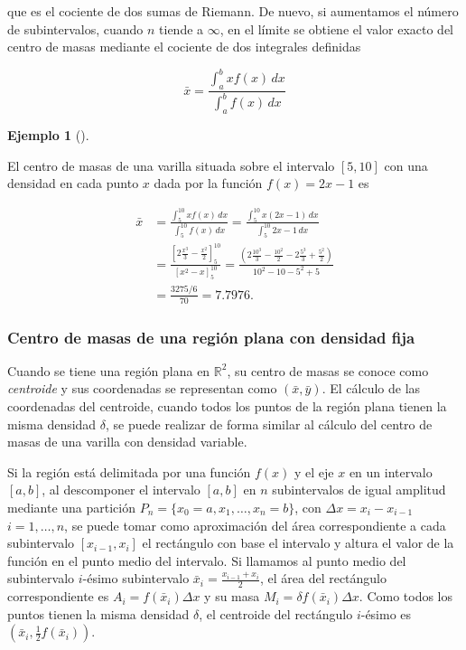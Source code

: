 \documentclass[
  a4paper,
]{scrreport}
\theoremstyle{definition}
\newtheorem{example}{Ejemplo}[chapter]
\theoremstyle{plain}
\theoremstyle{definition}
\theoremstyle{definition}
\theoremstyle{plain}
\theoremstyle{plain}
\theoremstyle{remark}
\begin{document}
que es el cociente de dos sumas de Riemann. De nuevo, si aumentamos el
número de subintervalos, cuando \(n\) tiende a \(\infty\), en el límite
se obtiene el valor exacto del centro de masas mediante el cociente de
dos integrales definidas

\[
\bar x = \frac{\int_a^b xf(x)\,dx}{\int_a^b f(x)\,dx}
\]

\begin{example}[]\protect\hypertarget{exm-centro-masas}{}\label{exm-centro-masas}

El centro de masas de una varilla situada sobre el intervalo \([5, 10]\)
con una densidad en cada punto \(x\) dada por la función \(f(x)=2x-1\)
es

\begin{align*}
\bar x 
&= \frac{\int_5^{10} xf(x)\,dx}{\int_5^{10} f(x)\,dx} 
= \frac{\int_5^{10} x(2x-1)\,dx}{\int_5^{10} 2x-1\,dx} \\
&= \frac{\left[2\frac{x^3}{3}-\frac{x^2}{2}\right]_5^{10}}{[x^2-x]_5^{10}}
= \frac{\left(2\frac{10^3}{3}-\frac{10^2}{2}-2\frac{5^3}{3}+\frac{5^2}{2}\right)}{10^2-10-5^2+5} \\
&= \frac{3275/6}{70} 
= 7.7976.
\end{align*}

\end{example}

\subsubsection{Centro de masas de una región plana con densidad
fija}\label{sec-centro-masas-region-plana-densidad-constante}

Cuando se tiene una región plana en \(\mathbb{R}^2\), su centro de masas
se conoce como \emph{centroide} y sus coordenadas se representan como
\((\bar x, \bar y)\). El cálculo de las coordenadas del centroide,
cuando todos los puntos de la región plana tienen la misma densidad
\(\delta\), se puede realizar de forma similar al cálculo del centro de
masas de una varilla con densidad variable.

Si la región está delimitada por una función \(f(x)\) y el eje \(x\) en
un intervalo \([a,b]\), al descomponer el intervalo \([a,b]\) en \(n\)
subintervalos de igual amplitud mediante una partición
\(P_n=\{x_0=a, x_1, \ldots, x_n=b\}\), con \(\Delta x=x_i-x_{i-1}\)
\(i=1, \ldots, n\), se puede tomar como aproximación del área
correspondiente a cada subintervalo \([x_{i-1},x_i]\) el rectángulo con
base el intervalo y altura el valor de la función en el punto medio del
intervalo. Si llamamos al punto medio del subintervalo \(i\)-ésimo
subintervalo \(\bar x_i=\frac{x_{i-1}+x_i}{2}\), el área del rectángulo
correspondiente es \(A_i = f(\bar x_i)\Delta x\) y su masa
\(M_i = \delta f(\bar x_i)\Delta x\). Como todos los puntos tienen la
misma densidad \(\delta\), el centroide del rectángulo \(i\)-ésimo es
\((\bar x_i, \frac{1}{2}f(\bar x_i))\).
\end{document}
